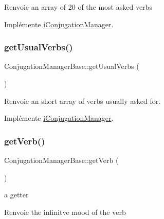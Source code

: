 \begin{DoxyReturn}{Renvoie}
an array of 20 of the most asked verbs 
\end{DoxyReturn}


Implémente \hyperlink{interfaceiConjugationManager_a0273fc00cbbf9e83823d571e3e2c8945}{i\+Conjugation\+Manager}.

\hypertarget{classConjugationManagerBase_a1dff05e951fe4453247a97f5aff5bc83}{}\label{classConjugationManagerBase_a1dff05e951fe4453247a97f5aff5bc83} 
\subsubsection{\texorpdfstring{get\+Usual\+Verbs()}{getUsualVerbs()}}
{\footnotesize\ttfamily Conjugation\+Manager\+Base\+::get\+Usual\+Verbs (\begin{DoxyParamCaption}{ }\end{DoxyParamCaption})\hspace{0.3cm}{\ttfamily [abstract]}}

\begin{DoxyReturn}{Renvoie}
an short array of verbs usually asked for. 
\end{DoxyReturn}


Implémente \hyperlink{interfaceiConjugationManager_a2a7ed39313c1c92ef5c01c88895de36e}{i\+Conjugation\+Manager}.

\hypertarget{classConjugationManagerBase_ae6e9d7d21418b8b9831b2b1f29eca4a6}{}\label{classConjugationManagerBase_ae6e9d7d21418b8b9831b2b1f29eca4a6} 
\subsubsection{\texorpdfstring{get\+Verb()}{getVerb()}}
{\footnotesize\ttfamily Conjugation\+Manager\+Base\+::get\+Verb (\begin{DoxyParamCaption}{ }\end{DoxyParamCaption})}



a getter 

\begin{DoxyReturn}{Renvoie}
the infinitve mood of the verb 
\end{DoxyReturn}
\hypertarget{classConjugationManagerBase_a266802b93062d79fa75c460dc72945d8}{}\label{classConjugationManagerBase_a266802b93062d79fa75c460dc72945d8} 
